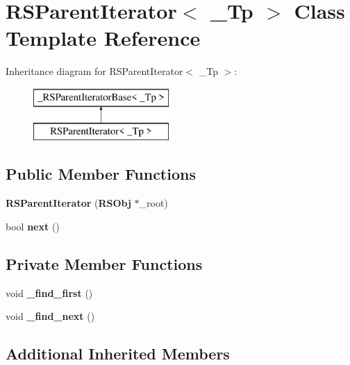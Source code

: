 \section{R\-S\-Parent\-Iterator$<$ \-\_\-\-Tp $>$ Class Template Reference}
\label{classRSParentIterator}
Inheritance diagram for R\-S\-Parent\-Iterator$<$ \-\_\-\-Tp $>$\-:\begin{figure}[H]
\begin{center}
\leavevmode
\includegraphics[height=2.000000cm]{classRSParentIterator}
\end{center}
\end{figure}
\subsection*{Public Member Functions}
\begin{DoxyCompactItemize}
\item 
{\bfseries R\-S\-Parent\-Iterator} ({\bf R\-S\-Obj} $\ast$\-\_\-root)\label{classRSParentIterator_a9617420a9952b2226df03c6c3f63875a}

\item 
bool {\bfseries next} ()\label{classRSParentIterator_a6885cd9f51ba64293cf0c4006b956dd7}

\end{DoxyCompactItemize}
\subsection*{Private Member Functions}
\begin{DoxyCompactItemize}
\item 
void {\bfseries \-\_\-find\-\_\-first} ()\label{classRSParentIterator_a710e28d238ff48bb73912f506a6601e4}

\item 
void {\bfseries \-\_\-find\-\_\-next} ()\label{classRSParentIterator_ad51eac67fa21053e85720cd673970d85}

\end{DoxyCompactItemize}
\subsection*{Additional Inherited Members}


